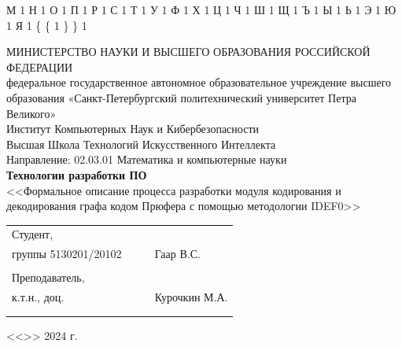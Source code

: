 \documentclass[a4paper, final]{article}
\begin{document}
{  {М}{ {\selectfont{}} }1
  {Н}{ {\selectfont{}} }1
  {О}{ {\selectfont{}} }1
  {П}{ {\selectfont{}} }1
  {Р}{ {\selectfont{}} }1
  {С}{ {\selectfont{}} }1
  {Т}{ {\selectfont{}} }1
  {У}{ {\selectfont{}} }1
  {Ф}{ {\selectfont{}} }1
  {Х}{ {\selectfont{}} }1
  {Ц}{ {\selectfont{}} }1
  {Ч}{ {\selectfont{}} }1
  {Ш}{ {\selectfont{}} }1
  {Щ}{ {\selectfont{}} }1
  {Ъ}{ {\selectfont{}} }1
  {Ы}{ {\selectfont{}} }1
  {Ь}{ {\selectfont{}} }1
  {Э}{ {\selectfont{}} }1
  {Ю}{ {\selectfont{}} }1
  {Я}{ {\selectfont{}} }1
  {\{}{ { {\color{brackets}\{} } }1 %
  {\} }{ { {\color{brackets}\} } } }1 %
}

\begin{center}
\hfill \break
\hfill \break
\normalsize{МИНИСТЕРСТВО НАУКИ И ВЫСШЕГО ОБРАЗОВАНИЯ РОССИЙСКОЙ ФЕДЕРАЦИИ\\
 федеральное государственное автономное образовательное учреждение высшего образования «Санкт-Петербургский политехнический университет Петра Великого»\\[5pt]}
\normalsize{Институт Компьютерных Наук и Кибербезопасности}\\[5pt] 
\normalsize{Высшая Школа Технологий Искусственного Интеллекта}\\[5pt] 
\normalsize{Направление: 02.03.01 Математика и компьютерные науки}\\

\hfill \break
\hfill \break
\hfill \break
\large{\textbf{Технологии разработки ПО}}\\
\hfill \break
\large{<<Формальное описание процесса разработки модуля кодирования и декодирования графа кодом Прюфера с помощью методологии IDEF0>>}\\

\hfill \break
\hfill \break
\end{center}
 
\small{ 
\begin{tabular}{lrrl}
\!\!\!Студент, & \hspace{2cm} & & \\
\!\!\!группы 5130201/20102 & \hspace{2cm} & \underline{\hspace{3cm}} & Гаар В.С. \\\\
\!\!\!Преподаватель, \hspace{2cm} & & \\
\!\!\!к.т.н., доц. & \hspace{2cm} & \underline{\hspace{3cm}} &  Курочкин М.А. \\\\
&&\hspace{5cm}
\end{tabular}
\begin{flushright}
<<\underline{\hspace{1cm}}>>\underline{\hspace{2.5cm}} 2024 г.
\end{flushright}
}
\end{document}
